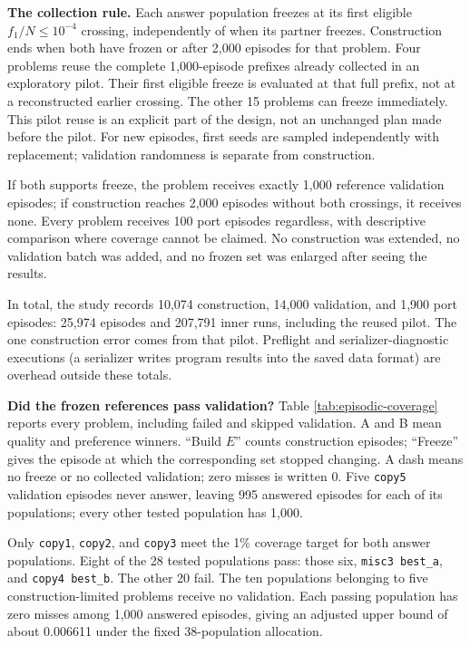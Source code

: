 \documentclass[10pt,letterpaper]{article}
\begin{document}
\textbf{The collection rule.} Each answer population freezes at its first eligible
\(f_1/N\le10^{-4}\) crossing, independently of when its partner freezes. Construction ends
when both have frozen or after 2,000 episodes for that problem. Four problems reuse the
complete 1,000-episode prefixes already collected in an exploratory pilot. Their first
eligible freeze is evaluated at that full prefix, not at a reconstructed earlier crossing.
The other 15 problems can freeze immediately. This pilot reuse is an explicit part of the
design, not an unchanged plan made before the pilot. For new episodes, first seeds are
sampled independently with replacement; validation randomness is separate from
construction.

If both supports freeze, the problem receives exactly 1,000 reference validation episodes;
if construction reaches 2,000 episodes without both crossings, it receives none. Every
problem receives 100 port episodes regardless, with descriptive comparison where coverage
cannot be claimed. No construction was extended, no validation batch was added, and no
frozen set was enlarged after seeing the results.

In total, the study records 10,074 construction, 14,000 validation, and 1,900 port
episodes: 25,974 episodes and 207,791 inner runs, including the reused pilot. The one
construction error comes from that pilot. Preflight and serializer-diagnostic executions
(a serializer writes program results into the saved data format) are overhead outside
these totals.

\textbf{Did the frozen references pass validation?} Table \ref{tab:episodic-coverage}
reports every problem, including failed and skipped validation. A and B mean quality and
preference winners. ``Build \(E\)'' counts construction episodes; ``Freeze'' gives the
episode at which the corresponding set stopped changing. A dash means no freeze or no
collected validation; zero misses is written 0. Five \texttt{copy5} validation episodes
never answer, leaving 995 answered episodes for each of its populations; every other
tested population has 1,000.



Only \texttt{copy1}, \texttt{copy2}, and \texttt{copy3} meet the 1\% coverage target for
both answer populations. Eight of the 28 tested populations pass: those six,
\texttt{misc3\ best\_a}, and \texttt{copy4\ best\_b}. The other 20 fail. The ten
populations belonging to five construction-limited problems receive no validation. Each
passing population has zero misses among 1,000 answered episodes, giving an adjusted upper
bound of about 0.006611 under the fixed 38-population allocation.
\end{document}
